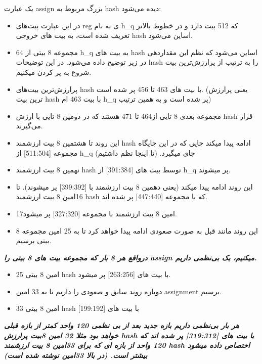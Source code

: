 یک عبارت assign بزرگ مربوط به hash دیده می‌شود:

\begin{itemize}
\item
در این عبارت بیت‌های reg ی به نام
 h\_q 
که 512 بیت دارد و در خطوط بالاتر تعریف شده است، به بیت های خروجی hash اساین می‌شود.
\item
64 مجموعه 8 بیتی از h\_q به بیت های hash اساین می‌شود که نظم این مقداردهی در زیر توضیح داده می‌شود. در این توضیحات hash را به ترتیب از پرارزش‌ترین بیت شروع به پر کردن میکنیم.
\item
پرارزش‌ترین بیت‌های hash با بیت های 463 تا 456 پر شده است. (یعنی پرارزش ترین بیت hash با بیت 463 ام h\_q پر شده است و به همین ترتیب)
\item
مجموعه بعدی 8 تایی از464 تا 471 هستند که در دومین 8 تایی با ارزش hash قرار می‌گیرند.
\item
این روند تا هشتمین 8 بیت ارزشمند hash ادامه پیدا میکند جایی که در این جایگاه مجموعه [511:504] از h\_q جای میگیرد. (تا اینجا نظم داشتیم)
\item
نهمین 8 بیت ارزشمند hash توسط بیت های [391:384] از h\_q پر میشوند.
\item
این روند ادامه پیدا میکند (یعنی دهمین 8 بیت ارزشمند با [399:392] پر میشوند).
تا 16امین 8 بیت ارزشمند hash که با مجموعه [447:440] پر شده اند.
\item
17امین 8 بیت ارزشمند با مجموعه [327:320] پر میشود.
\item
این روند مانند قبل به صورت صعودی ادامه پیدا خواهد کرد تا به 25 امین مجموعه 8 بیتی برسیم.

\end{itemize}

\textit{\textbf{درواقع هر 8 بار که مجموعه بیت های 8 بیتی را assign میکنیم، یک بی‌نظمی داریم.
}}
\begin{itemize}
\item
25 امین 8 بیتی hash با بیت های [263:256] پر میشود.
\item
دوباره روند سابق و صعودی را داریم تا به 33 امین assignment برسیم.
\item
33 امین 8 بیتی hash با بیت های [199:192]

\end{itemize}

\textit{\textbf{هر بار بی‌نظمی داریم بازه جدید بعد از بی نظمی 120 واحد کمتر از بازه قبلی خواهد بود مثلا 32 امین 8بیت پرارزش hash با بیت های [319:312] پر شده اند که 120 واحد از بازه ای که برای 33امین 8 بیت ارزشمند hash اختصاص داده میشود بیشتر است. (در بالا 33امین نوشته شده است)}}

